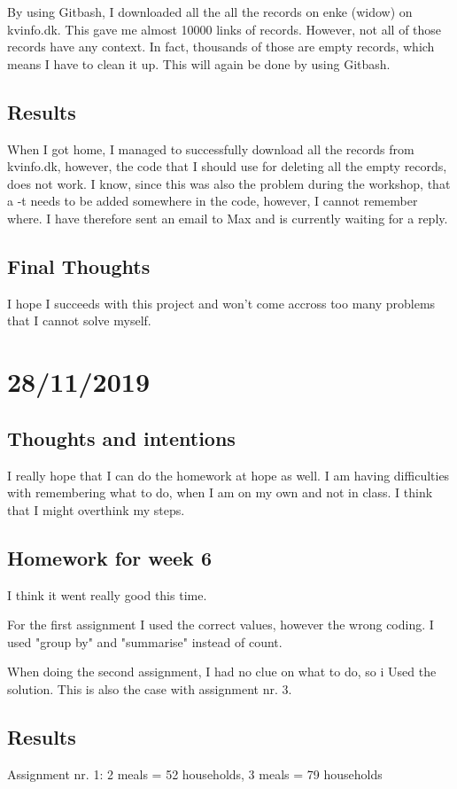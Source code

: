 \documentclass{article}
\begin{document}
\begin{itemize}
By using Gitbash, I downloaded all the all the records on enke (widow) on kvinfo.dk. This gave me almost 10000 links of records. 
However, not all of those records have any context. In fact, thousands of those are empty records, which means I have to clean it up. This will again be done by using Gitbash. 

\subsection{Results}
When I got home, I managed to successfully download all the records from kvinfo.dk, however, the code that I should use for deleting all the empty records, does not work. I know, since this was also the problem during the workshop, that a -t needs to be added somewhere in the code, however, I cannot remember where. I have therefore sent an email to Max and is currently waiting for a reply.

\subsection{Final Thoughts}
I hope I succeeds with this project and won't come accross too many problems that I cannot solve myself. 

\section{28/11/2019}
\subsection{Thoughts and intentions}
I really hope that I can do the homework at hope as well. I am having difficulties with remembering what to do, when I am on my own and not in class. I think that I might overthink my steps. 

\subsection{Homework for week 6}
I think it went really good this time. 

For the first assignment I used the correct values, however the wrong coding. I used "group by" and "summarise" instead of count.

When doing the second assignment, I had no clue on what to do, so i Used the solution. This is also the case with assignment nr. 3. 

\subsection{Results}
Assignment nr. 1: 2 meals = 52 households, 3 meals = 79 households


\end{itemize}
\end{document}
